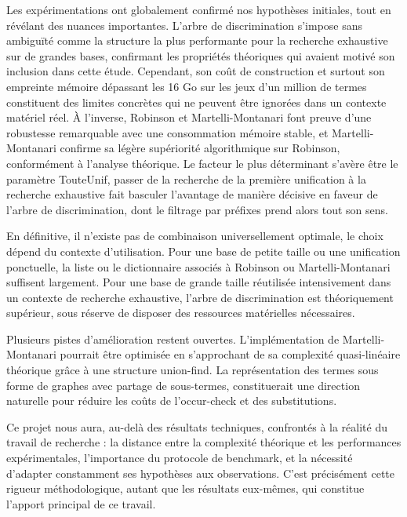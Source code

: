 \documentclass[11pt]{article}
\begin{document}
    \vspace{0.3cm}
    Les expérimentations ont globalement confirmé nos hypothèses initiales, tout en révélant des nuances importantes. L'arbre de discrimination s'impose sans ambiguïté comme la structure la plus performante pour la recherche exhaustive sur de grandes bases, confirmant les propriétés théoriques qui avaient motivé son inclusion dans cette étude. Cependant, son coût de construction et surtout son empreinte mémoire dépassant les 16 Go sur les jeux d'un million de termes constituent des limites concrètes qui ne peuvent être ignorées dans un contexte matériel réel. À l'inverse, Robinson et Martelli-Montanari font preuve d'une robustesse remarquable avec une consommation mémoire stable, et Martelli-Montanari confirme sa légère supériorité algorithmique sur Robinson, conformément à l'analyse théorique. Le facteur le plus déterminant s'avère être le paramètre TouteUnif, passer de la recherche de la première unification à la recherche exhaustive fait basculer l'avantage de manière décisive en faveur de l'arbre de discrimination, dont le filtrage par préfixes prend alors tout son sens.

    \vspace{0.3cm}
    En définitive, il n'existe pas de combinaison universellement optimale, le choix dépend du contexte d'utilisation. Pour une base de petite taille ou une unification ponctuelle, la liste ou le dictionnaire associés à Robinson ou Martelli-Montanari suffisent largement. Pour une base de grande taille réutilisée intensivement dans un contexte de recherche exhaustive, l'arbre de discrimination est théoriquement supérieur, sous réserve de disposer des ressources matérielles nécessaires.

    \vspace{0.3cm}
    Plusieurs pistes d'amélioration restent ouvertes. L'implémentation de Martelli-Montanari pourrait être optimisée en s'approchant de sa complexité quasi-linéaire théorique grâce à une structure union-find. La représentation des termes sous forme de graphes avec partage de sous-termes, constituerait une direction naturelle pour réduire les coûts de l'occur-check et des substitutions.
    
    \vspace{0.3cm} 
    Ce projet nous aura, au-delà des résultats techniques, confrontés à la réalité du travail de recherche : la distance entre la complexité théorique et les performances expérimentales, l'importance du protocole de benchmark, et la nécessité d'adapter constamment ses hypothèses aux observations. C'est précisément cette rigueur méthodologique, autant que les résultats eux-mêmes, qui constitue l'apport principal de ce travail.
\end{document}
